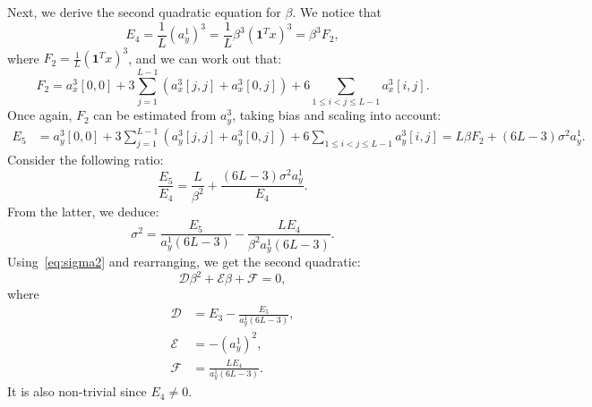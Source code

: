 \documentclass[12pt]{article}
\newcommand{\1}{\mathbf{1}}
\newcommand{\one}{\mathbf{1}}
\theoremstyle{plain}
\theoremstyle{definition}
\theoremstyle{remark}
\theoremstyle{plain}
\theoremstyle{remark}
\theoremstyle{plain}
\theoremstyle{plain}
\theoremstyle{plain}
\numberwithin{equation}{section}
\begin{document}
Next, we derive the second quadratic equation for $\beta$. We notice that 
\begin{equation} \label{eq:E3}
E_4 = \frac{1}{L}(a_y^1)^3 = \frac{1}{L}\beta^3 (\one ^Tx)^3   = \beta^3 F_2,
\end{equation}
where $F_2 = \frac{1}{L}(\one ^Tx)^3$, and we can work out that:
\begin{equation*}
F_2 = a_x^3[0,0] + 3\sum_{j=1}^{L-1} \left(a_x^3[j,j] + a_x^3[0,j]\right) + 6\sum_{1\leq i < j\leq L-1}a_x^3[i,j].
\end{equation*}
Once again, $F_2$ can be estimated from $a_y^3$, taking bias and scaling into account:
\begin{align}
E_5 & = a_y^3[0,0] + 3\sum_{j=1}^{L-1} \left(a_y^3[j,j] + a_y^3[0,j]\right) + 6\sum_{1\leq i < j\leq L-1}a_y^3[i,j]  = L \beta F_2 + (6L-3)\sigma^2a_y^1.
\end{align}
Consider the following ratio:
\begin{equation*} 
\frac{E_5}{E_4} = \frac{L}{\beta^2} + \frac{(6L-3)\sigma^2a_y^1}{E_4}.
\end{equation*}
From the latter, we deduce:
\begin{equation*}
\sigma^2 = \frac{E_5}{a_y^1(6L-3)}  - \frac{LE_4}{\beta^2a_y^1(6L-3)}.
\end{equation*}
Using~\eqref{eq:sigma2} and rearranging, we get the second quadratic:
\begin{equation} \label{eq:quad2}
\mathcal{D}\beta^2 + \mathcal{E}\beta + \mathcal{F} = 0,
\end{equation}
where
\begin{align*}
\mathcal{D} &= E_3 - \frac{E_5}{a_y^1(6L-3)}, \\ 
\mathcal{E} &= -(a_y^1)^2, \\
\mathcal{F} &= \frac{LE_4}{a_y^1(6L-3)}.
\end{align*}
It is also non-trivial since $E_4 \neq 0$.
\end{document}
